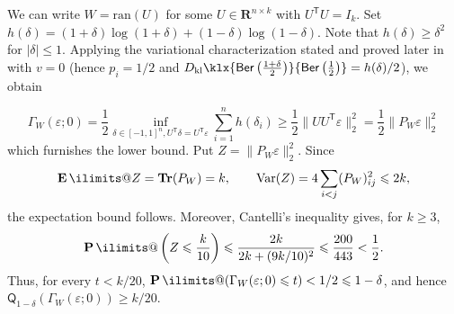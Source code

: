 \documentclass[11pt, letterpaper, hidelinks]{article}
\makeatletter
\renewcommand{\proofname}{\textit{\textbf{Proof}}}
\renewenvironment{proof}[1][\proofname]{\par\pushQED{\qed}\normalfont \topsep6\p@\@plus6\p@\relax\trivlist\item[\hskip\labelsep#1\@addpunct{}]\ignorespaces}{\popQED\endtrivlist\@endpefalse}
\newcommand{\R}{\mathbf R}
\newcommand{\1}{\mathbf 1}
\newcommand{\half}{\frac12}
\newcommand{\eps}{\varepsilon}
\renewcommand{\leq}{\leqslant}
\renewcommand{\geq}{\geqslant}
\DeclareMathOperator{\trace}{\bf Tr}
\newcommand{\T}{\mathsf{T}}
\newcommand{\kl}{D_{\rm kl}\klx}
\newcommand{\Var}{\mathrm{Var}}
\newcommand{\E}{\operatorname*{\mathbf{E}}\ilimits@}
\renewcommand{\P}{\operatorname*{\mathbf{P}}\ilimits@}
\theoremstyle{plain}
\theoremstyle{definition}
\newcommand{\Quant}[1]{\mathsf{Q}_{#1}}
\newcommand{\Ber}[1]{\mathsf{Ber}\left(#1\right)}
\newcommand{\ran}{\mathrm{ran}}
\makeatother
\begin{document}
\begin{proof}
We can write $W = \ran(U)$ for some $U \in \R^{n \times k}$ with $U^\T U = I_k$. Set $h(\delta) = (1+\delta) \log(1+\delta) + (1-\delta) \log(1-\delta)$. Note that $h(\delta) \geq \delta^2$ for $|\delta| \leq 1$. Applying the variational characterization stated and proved later in~ with $v=0$ (hence $p_i=1/2$ and
$\kl{\Ber{\frac{1+\delta}{2}}}{\Ber{\tfrac{1}{2}}}=h(\delta)/2$), we obtain

\[
\Gamma_W(\eps; 0) = \half \inf_{\delta \in [-1,1]^n, U^\T \delta = U^\T \eps} 
\sum_{i=1}^n h(\delta_i) 
\geq  \half \|UU^\T \eps\|_2^2 = 
\half \|P_W \eps\|_2^2
\]
which furnishes the lower bound. Put $Z=\|P_W\eps\|_2^2$. Since
\[
\E Z=\trace(P_W)=k,
\qquad
\Var(Z)=4\sum_{i<j}(P_W)_{ij}^2\leq 2k,
\]
the expectation bound follows. Moreover, Cantelli's inequality gives, for
$k\geq3$,
\[
\P\left(Z\leq\frac{k}{10}\right)
\leq
\frac{2k}{2k+(9k/10)^2}
\leq \frac{200}{443}<\frac12.
\]
Thus, for every $t<k/20$,
$\P(\Gamma_W(\eps;0)\leq t)<1/2\leq1-\delta$, and hence
$\Quant{1-\delta}(\Gamma_W(\eps;0))\geq k/20$.
\end{proof}
\end{document}
